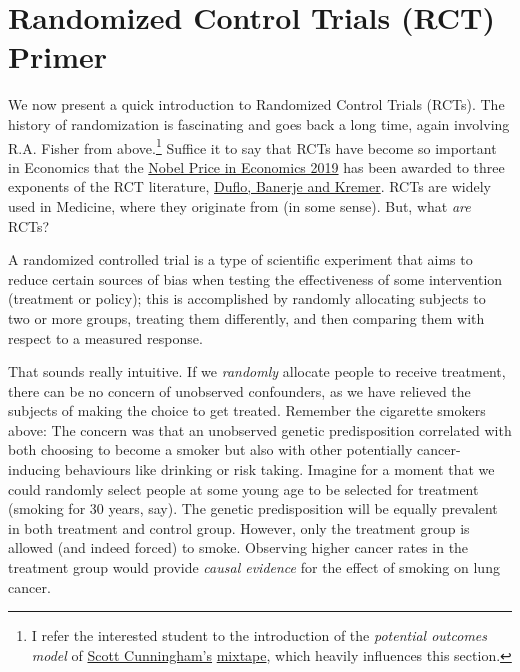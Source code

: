 \documentclass[]{book}
\newenvironment{note}{\begin{tcolorbox}[colback=blue!5!white,colframe=blue!75!black]}{\end{tcolorbox}}
\begin{document}
\hypertarget{rct}{%
\section{Randomized Control Trials (RCT) Primer}\label{rct}}

We now present a quick introduction to Randomized Control Trials (RCTs). The history of randomization is fascinating and goes back a long time, again involving R.A. Fisher from above.\footnote{I refer the interested student to the introduction of the \emph{potential outcomes model} of \href{https://twitter.com/causalinf}{Scott Cunningham's} \href{http://scunning.com/cunningham_mixtape.pdf}{mixtape}, which heavily influences this section.} Suffice it to say that RCTs have become so important in Economics that the \href{https://www.nobelprize.org/prizes/economic-sciences/2019/summary/}{Nobel Price in Economics 2019} has been awarded to three exponents of the RCT literature, \href{https://www.economist.com/finance-and-economics/2019/10/17/a-nobel-economics-prize-goes-to-pioneers-in-understanding-poverty}{Duflo, Banerje and Kremer}. RCTs are widely used in Medicine, where they originate from (in some sense). But, what \emph{are} RCTs?

\begin{note}
A randomized controlled trial is a type of scientific experiment that
aims to reduce certain sources of bias when testing the effectiveness of
some intervention (treatment or policy); this is accomplished by
randomly allocating subjects to two or more groups, treating them
differently, and then comparing them with respect to a measured
response.
\end{note}

That sounds really intuitive. If we \emph{randomly} allocate people to receive treatment, there can be no concern of unobserved confounders, as we have relieved the subjects of making the choice to get treated. Remember the cigarette smokers above: The concern was that an unobserved genetic predisposition correlated with both choosing to become a smoker but also with other potentially cancer-inducing behaviours like drinking or risk taking. Imagine for a moment that we could randomly select people at some young age to be selected for treatment (smoking for 30 years, say). The genetic predisposition will be equally prevalent in both treatment and control group. However, only the treatment group is allowed (and indeed forced) to smoke. Observing higher cancer rates in the treatment group would provide \emph{causal evidence} for the effect of smoking on lung cancer.
\end{document}
